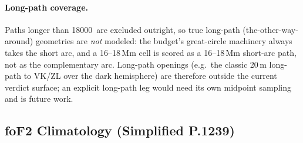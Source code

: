 \documentclass[11pt,a4paper]{article}
\newcommand{\SI}[2]{#1\,\text{#2}}
\newcommand{\km}{\text{km}}
\begin{document}
\paragraph{Long-path coverage.}  Paths longer than
\SI{18000}{\km} are excluded outright, so true long-path
(the-other-way-around) geometries are \emph{not} modeled: the
budget's great-circle machinery always takes the short arc, and a
16--18\,Mm cell is scored as a 16--18\,Mm short-arc path, not as
the complementary arc.  Long-path openings (e.g.\ the classic
20\,m long-path to VK/ZL over the dark hemisphere) are therefore
outside the current verdict surface; an explicit long-path leg
would need its own midpoint sampling and is future work.

\subsection{foF2 Climatology (Simplified P.1239)}\label{sec:climo}
\end{document}
